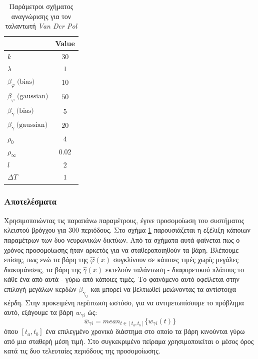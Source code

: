 {\begin{table}
		\centering
		\captionsetup{format=plain}
		\begin{tabular}{ l | c }
			\hline\hline
			\text{Parameter} & Value \\ \hline\hline
			$k$             & $30$   \\ \hline
			$\lambda$       & $1 $   \\ \hline
			$\beta_{\varphi} \;\text{(bias)}$     & $10$ \\ \hline
			$\beta_{\varphi} \;\text{(gaussian)}$ & $50$ \\ \hline
			$\beta_{\gamma} \;\text{(bias)}$     & $5$ \\ \hline
			$\beta_{\gamma} \;\text{(gaussian)}$ & $20$ \\ \hline
			$\rho_0      $ & $4$  \\ \hline
			$\rho_\infty $ & $0.02$  \\ \hline
			$l           $ & $2$  \\ \hline
			$\textit{ΔΤ} $  & $1$ 	\\ \hline \hline	
		\end{tabular}
		\caption{Παράμετροι σχήματος αναγνώρισης για τον ταλαντωτή \textit{Van Der Pol}}
		\label{tab:vdp_schema_params}
	\end{table}

\subsubsection{Αποτελέσματα}
Χρησιμοποιώντας τις παραπάνω παραμέτρους, έγινε προσομοίωση του συστήματος κλειστού βρόγχου για $300$ περιόδους. Στο σχήμα \ref{tab:vdp_schema_params} παρουσιάζεται η εξέλιξη κάποιων παραμέτρων των δυο νευρωνικών δικτύων. Από τα σχήματα αυτά φαίνεται πως ο χρόνος προσομοίωσης ήταν αρκετός για να σταθεροποιηθούν τα βάρη. Βλέπουμε επίσης, πως ενώ τα βάρη της $\hat{\varphi}(x)$ συγκλίνουν σε κάποιες τιμές χωρίς μεγάλες διακυμάνσεις, τα βάρη της $\hat{\gamma}(x)$ εκτελούν ταλάντωση - διαφορετικού πλάτους το κάθε ένα από αυτά - γύρω από κάποιες τιμές. Το φαινόμενο αυτό οφείλεται στην επιλογή μεγάλων κερδών $\beta_{\gamma_{ij}}$ και μπορεί να βελτιωθεί μειώνοντας τα αντίστοιχα κέρδη. Στην προκειμένη περίπτωση ωστόσο, για να αντιμετωπίσουμε το πρόβλημα αυτό, εξάγουμε τα βάρη $w_{\gamma i}$ ώς:
\begin{equation*}
	\bar{w}_{\gamma i} = mean_{t \in [t_a,t_b]} \{w_{\gamma i}(t)\}
\end{equation*}
όπου $[t_a,t_b]$ ένα επιλεγμένο χρονικό διάστημα στο οποίο τα βάρη κινούνται γύρω από μια σταθερή μέση τιμή. Στο συγκεκριμένο πείραμα χρησιμοποιείται ο μέσος όρος κατά τις δυο τελευταίες περιόδους της προσομοίωσης.

}
